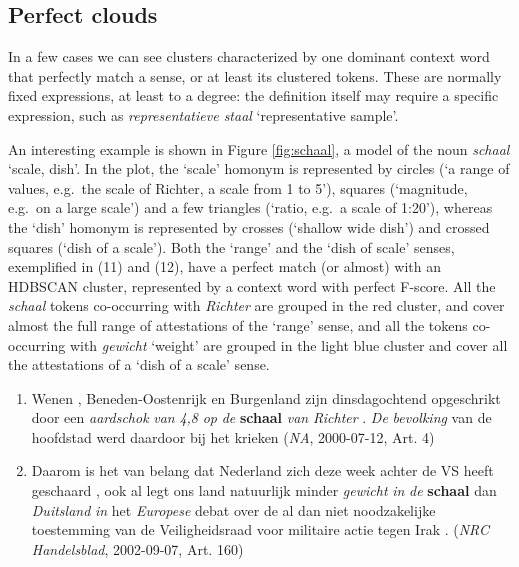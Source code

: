 \documentclass[
]{book}
\begin{document}
\hypertarget{perfect-clouds}{%
\subsection{Perfect clouds}\label{perfect-clouds}}

In a few cases we can see clusters characterized by one dominant context word that perfectly match a sense, or at least its clustered tokens. These are normally fixed expressions, at least to a degree: the definition itself may require a specific expression, such as \emph{representatieve staal} `representative sample'.

An interesting example is shown in Figure \ref{fig:schaal}, a model of the noun \emph{schaal} `scale, dish'. In the plot, the `scale' homonym is represented by circles (`a range of values, e.g.~the scale of Richter, a scale from 1 to 5'), squares (`magnitude, e.g.~on a large scale') and a few triangles (`ratio, e.g.~a scale of 1:20'), whereas the `dish' homonym is represented by crosses (`shallow wide dish') and crossed squares (`dish of a scale').
Both the `range' and the `dish of scale' senses, exemplified in (11) and (12), have a perfect match (or almost) with an HDBSCAN cluster, represented by a context word with perfect F-score. All the \emph{schaal} tokens co-occurring with \emph{Richter} are grouped in the red cluster, and cover almost the full range of attestations of the `range' sense, and all the tokens co-occurring with \emph{gewicht} `weight' are grouped in the light blue cluster and cover all the attestations of a `dish of a scale' sense.

\begin{enumerate}
\def\labelenumi{(\arabic{enumi})}
\setcounter{enumi}{10}
\item
  Wenen , Beneden-Oostenrijk en Burgenland zijn dinsdagochtend opgeschrikt door een \emph{aardschok} \emph{van} \emph{4,8} \emph{op} \emph{de} \textbf{schaal} \emph{van} \emph{Richter} . \emph{De} \emph{bevolking} van de hoofdstad werd daardoor bij het krieken (\emph{NA}, 2000-07-12, Art. 4)
\item
  Daarom is het van belang dat Nederland zich deze week achter de VS heeft geschaard , ook al legt ons land natuurlijk minder \emph{gewicht} \emph{in} \emph{de} \textbf{schaal} dan \emph{Duitsland} \emph{in} het \emph{Europese} debat over de al dan niet noodzakelijke toestemming van de Veiligheidsraad voor militaire actie tegen Irak . (\emph{NRC Handelsblad}, 2002-09-07, Art. 160)
\end{enumerate}
\end{document}
